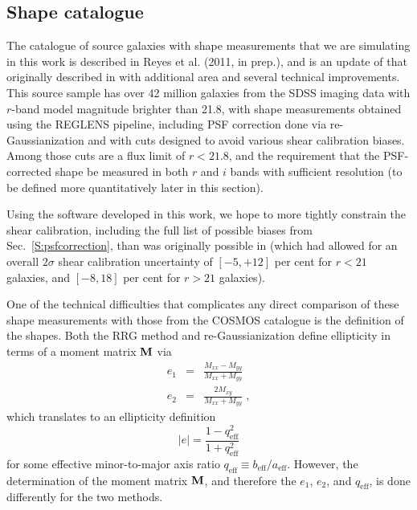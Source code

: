 \documentclass[twocolumn,useAMS,usenatbib]{mn2e}
\newcommand{\beq}{\begin{equation}}
\newcommand{\eeq}{\end{equation}}
\newcommand{\beqa}{\begin{eqnarray}}
\newcommand{\eeqa}{\end{eqnarray}}
\newcommand{\newtext}{}
\begin{document}
\subsection{Shape catalogue}\label{SS:shapecatalog}

The catalogue of source galaxies with shape measurements that we are
simulating in this work is described in Reyes et al. (2011, in prep.),
and is an update of that originally described in
\citet{2005MNRAS.361.1287M} with additional area and several technical
improvements.  This source sample has over 42 million galaxies from
the SDSS imaging data with $r$-band model magnitude brighter than
21.8, with shape measurements obtained using the REGLENS pipeline,
including PSF correction done via re-Gaussianization
\citep{2003MNRAS.343..459H} and with cuts designed to avoid various
shear calibration biases. Among those cuts are a flux limit of
$r<21.8$, and the requirement that the PSF-corrected shape be measured
in both $r$ and $i$ bands with sufficient resolution (to be defined
more quantitatively later in this section). 

Using the software developed in this work,
we hope to more tightly constrain the shear calibration, including the
full list of possible biases from Sec.~\ref{S:psfcorrection}, than was
originally possible in \citet{2005MNRAS.361.1287M} \newtext{(which had allowed
for an overall $2\sigma$ shear calibration uncertainty of $[-5, +12]$
per cent for $r<21$ galaxies, and $[-8, 18]$ per cent for $r>21$ galaxies).}


One of the technical difficulties that complicates any direct comparison of
these shape measurements with those from the COSMOS catalogue is the
definition of the shapes.  Both the RRG method and
re-Gaussianization define ellipticity in terms of a moment matrix
${\bf M}$ via
\beqa
e_1 &=& \frac{M_{xx}-M_{yy}}{M_{xx}+M_{yy}} \nonumber \\
e_2 &=& \frac{2M_{xy}}{M_{xx}+M_{yy}}\;,
\eeqa
which translates to an ellipticity definition
\beq\label{E:ellipdef}
|e| = \frac{1-q_\mathrm{eff}^2}{1+q_\mathrm{eff}^2}
\eeq
for some effective minor-to-major axis ratio $q_\mathrm{eff}\equiv
b_\mathrm{eff}/a_\mathrm{eff}$.  However, the determination of the
moment matrix ${\bf M}$, and therefore the $e_1$, $e_2$, and $q_\mathrm{eff}$, 
is done differently for the two methods.
\end{document}
